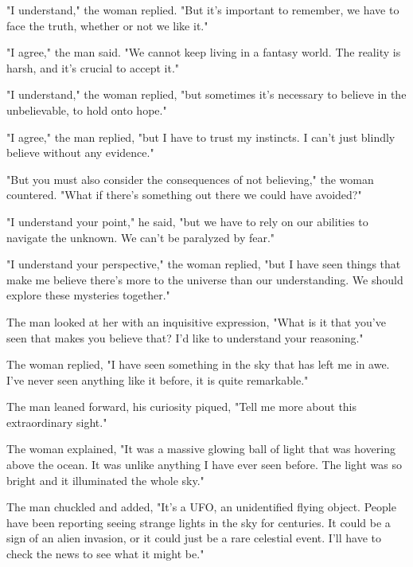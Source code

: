 \documentclass[smalldemyvopaper,11pt,twoside,onecolumn,openright,extrafontsizes]{memoir}
\begin{document}
"I understand," the woman replied. "But it's important to remember, we have to face the truth, whether or not we like it."\par
"I agree," the man said. "We cannot keep living in a fantasy world. The reality is harsh, and it's crucial to accept it."\par
"I understand," the woman replied, "but sometimes it's necessary to believe in the unbelievable, to hold onto hope."\par
"I agree," the man replied, "but I have to trust my instincts. I can't just blindly believe without any evidence."\par
"But you must also consider the consequences of not believing," the woman countered. "What if there's something out there we could have avoided?"\par
"I understand your point," he said, "but we have to rely on our abilities to navigate the unknown. We can't be paralyzed by fear."\par
"I understand your perspective," the woman replied, "but I have seen things that make me believe there's more to the universe than our understanding. We should explore these mysteries together."\par
The man looked at her with an inquisitive expression, "What is it that you've seen that makes you believe that? I'd like to understand your reasoning."\par
The woman replied, "I have seen something in the sky that has left me in awe. I've never seen anything like it before, it is quite remarkable."\par
The man leaned forward, his curiosity piqued, "Tell me more about this extraordinary sight."\par
The woman explained, "It was a massive glowing ball of light that was hovering above the ocean. It was unlike anything I have ever seen before. The light was so bright and it illuminated the whole sky."\par
The man chuckled and added, "It's a UFO, an unidentified flying object. People have been reporting seeing strange lights in the sky for centuries. It could be a sign of an alien invasion, or it could just be a rare celestial event. I'll have to check the news to see what it might be."\par
\end{document}
